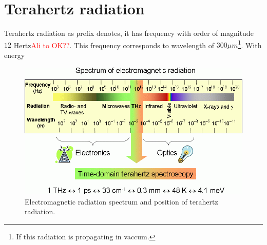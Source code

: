 \documentclass[english,11pt,a4paper]{article}
\numberwithin{equation}{section} %
\numberwithin{figure}{section} %
\numberwithin{table}{section} %
\begin{document}
\section{Terahertz radiation}
Terahertz radiation as prefix denotes, it has frequency with order of magnitude $12$ Hertz\textcolor{red}{Ali to OK??}. This frequency corresponds to wavelength of $300\mu m$\footnote{If this radiation is propagating in vaccum.}. With energy 



 
 
 
\begin{figure}[!htb]
\centering
\includegraphics[scale=0.5]{slike/spectrum_b.png}
\caption{Electromagnetic radiation spectrum and position of terahertz radiation. \cite{em-spectrum}}
\end{figure}


%
%
%
%
%
%
\end{document}
